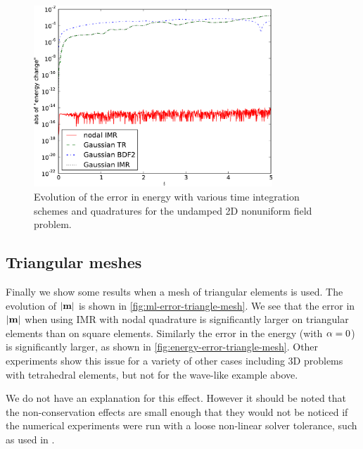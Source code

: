 \begin{figure}
  \centering
  \includegraphics[width=0.8\textwidth]
  {plots/nonuniform-h-energy-change/absofenergychangevstimes.pdf}
  \caption{
    Evolution of the error in energy
    with various time integration schemes and quadratures
    for the undamped 2D nonuniform field problem.
  }
  \label{fig:nonuniform-h-energy-error}
\end{figure}


\subsection{Triangular meshes}
\label{sec:triangular-meshes}

Finally we show some results when a mesh of triangular elements is used.
The evolution of $\left|{\boldsymbol{\mathrm{m}}} \right|$ is shown in \cref{fig:ml-error-triangle-mesh}.
We see that the error in $\left|{\boldsymbol{\mathrm{m}}} \right|$ when using IMR with nodal quadrature is significantly larger on triangular elements than on square elements.
Similarly the error in the energy (with $\alpha = 0$) is significantly larger, as shown in \cref{fig:energy-error-triangle-mesh}.
Other experiments show this issue for a variety of other cases including 3D problems with tetrahedral elements, but not for the wave-like example above.

We do not have an explanation for this effect.
However it should be noted that the non-conservation effects are small enough that they would not be noticed if the numerical experiments were run with a loose non-linear solver tolerance, such as used in \eg \cite{Bartels2006}.

